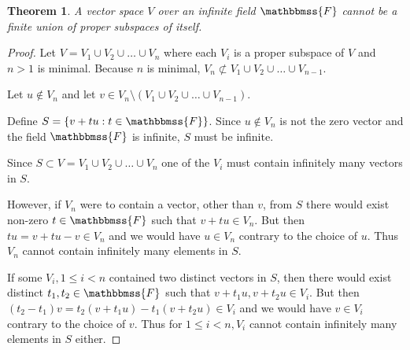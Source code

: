 \documentclass[12pt]{article}
\newtheorem{thm}{Theorem}
\begin{document}
\begin{thm}
A vector space $V$ over an infinite field $\mathbbmss{F}$ cannot be
a finite union of proper subspaces of itself.
\end{thm}

\begin{proof}
Let $V = V_{1} \cup V_{2} \cup \ldots \cup V_{n}$ where
each $V_{i}$ is a proper subspace of $V$ and $n > 1$ is minimal.
Because $n$ is minimal, $V_{n} \not\subset V_{1} \cup V_{2}
\cup \ldots \cup V_{n-1}$.

Let $u \not\in V_{n}$ and let $v \in V_{n} \setminus \left(V_{1}
\cup V_{2} \cup \ldots \cup V_{n-1}\right)$.

Define $S = \left\{v + tu : t \in \mathbbmss{F}\right\}$. Since 
$u\not\in V_{n}$ is not the zero vector and the field 
$\mathbbmss{F}$ is infinite, $S$ must be infinite.

Since $S \subset V = V_{1} \cup V_{2} \cup \ldots \cup
V_{n}$ one of the $V_{i}$ must contain infinitely many vectors in
$S$.

However, if $V_{n}$ were to contain a vector, other than $v$, from $S$ there would
exist non-zero $t \in \mathbbmss{F}$ such that $v + tu \in V_{n}$.
But then $tu = v + tu - v \in V_{n}$ and we would have $u \in V_{n}$
contrary to the choice of $u$. Thus $V_{n}$ cannot contain
infinitely many elements in $S$.

If some $V_{i}, 1 \leq i < n$ contained two distinct vectors in $S$,
then there would exist distinct $t_{1}, t_{2} \in \mathbbmss{F}$
such that $v + t_{1}u, v + t_{2}u \in V_{i}$. But then $\left(t_{2}
- t_{1}\right)v = t_{2}\left(v + t_{1}u\right) - t_{1}\left(v +
t_{2}u\right) \in V_{i}$ and we would have $v \in V_{i}$ contrary to
the choice of $v$. Thus for $1 \leq i < n, V_{i}$ cannot contain
infinitely many elements in $S$ either.
\end{proof}
\end{document}
